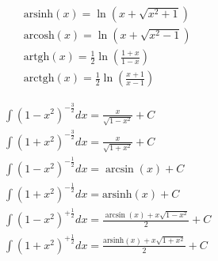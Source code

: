 \begin{minipage}[t]{0.5\textwidth}
	\vspace{0pt}
	\begin{tcolorbox}[title=\textbf{Inverse Hyperbolic Functions}]
		\vspace{-10pt}
		\begin{align*}
			& \text{arsinh}(x) = \ln(x + \sqrt{x^2 + 1})
			\\[3.0375pt]
			& \text{arcosh}(x) = \ln(x + \sqrt{x^2 - 1})
			\\[3.0375pt]
			& \text{artgh}(x) = \frac{1}{2} \ln
			\left(
			\frac{1+x}{1-x}
			\right)
			\\[3.0375pt]
			& \text{arctgh}(x) = \frac{1}{2} \ln
			\left(
			\frac{x+1}{x-1}
			\right)
		\end{align*}
		
	\end{tcolorbox}
	\begin{tcolorbox}[title=\textbf{Indefinite Integrals}]
		\vspace{-10pt}
		\begin{align*}
			& \int (1-x^2)^{-\frac{3}{2}} dx = \frac{x}{\sqrt{1-x^2}} + C
			\\[3.0375pt]
			& \int (1+x^2)^{-\frac{3}{2}} dx = \frac{x}{\sqrt{1 + x^2}} + C
			\\[3.0375pt]
			& \int (1-x^2)^{-\frac{1}{2}} dx = \arcsin(x) + C
			\\[3.0375pt]
			& \int (1+x^2)^{-\frac{1}{2}} dx = \text{arsinh}(x) + C
			\\[3.0375pt]
			& \int (1-x^2)^{+\frac{1}{2}} dx = \frac{\arcsin(x) + x \sqrt{1-x^2}}{2} + C
			\\[3.0375pt]
			& \int (1+x^2)^{+\frac{1}{2}} dx = \frac{\text{arsinh}(x) + x \sqrt{1 + x^2}}{2} + C
		\end{align*}
		
	\end{tcolorbox}
\end{minipage}

